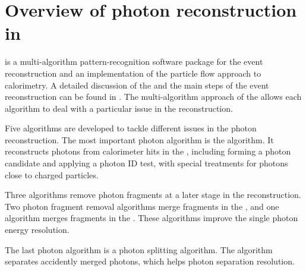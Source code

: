 
\section{Overview of photon reconstruction in \pandora}

\pandora is a multi-algorithm pattern-recognition software package for the event reconstruction and an implementation of the particle flow approach to calorimetry. A detailed discussion of the \pandora and the main steps of the \pandora event reconstruction can be found in . The multi-algorithm approach of the \pandora allows each algorithm to deal with a particular issue in the reconstruction. 


Five algorithms are developed to tackle different issues in the photon reconstruction. The most important photon algorithm is the \PhotonReconstruction algorithm. It reconstructs photons from calorimeter hits in the \ECAL, including forming a photon candidate and applying a photon ID test, with special treatments for photons close to charged particles. %


Three algorithms remove photon fragments at a later stage in the reconstruction. Two photon fragment removal algorithms merge fragments in the \ECAL, and one algorithm merges fragments in the \HCAL. These algorithms improve the single photon energy resolution.

The last photon algorithm is a photon splitting algorithm. The algorithm separates accidently merged photons, which helps photon separation resolution.


